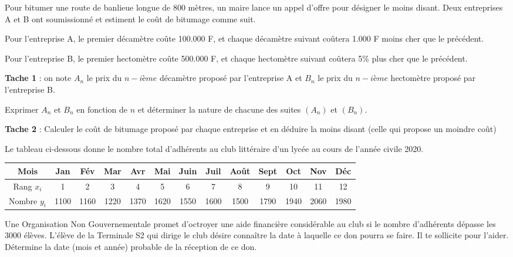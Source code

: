 \begin{exercice}
Pour bitumer une route de banlieue longue de 800 mètres, un maire lance un appel d’offre pour
désigner le moins disant. Deux entreprises A et B ont soumissionné et estiment le coût de bitumage
comme suit.
\medskip

\noindent Pour l’entreprise A, le premier décamètre coûte 100.000 F, et chaque décamètre suivant coûtera
1.000 F moins cher que le précédent.
\medskip

\noindent Pour l’entreprise B, le premier hectomètre coûte 500.000 F, et chaque hectomètre suivant coûtera
5\% plus cher que le précédent.

\medskip

\noindent \textbf{Tache 1 }: on note $A_n$ le prix du $n-ième$ décamètre proposé par l’entreprise A et $B_n$ le prix du $n-ième$ hectomètre proposé par l’entreprise B.

\noindent Exprimer $A_n$ et $B _n$ en fonction de $n$ et déterminer la nature de
chacune des suites $(A_n )$ et $(B_n )$.


\medskip
\noindent\textbf{Tache 2} : Calculer le coût de bitumage proposé par chaque entreprise et en déduire la moins disant
(celle qui propose un moindre coût)


\end{exercice}
\begin{exercice}



Le tableau ci-dessous donne le nombre total d’adhérents au club littéraire d’un lycée au cours de l’année civile 2020.

\begin{center}
\begin{tabular}{|c|c|c|c|c|c|c|c|c|c|c|c|c|}
\hline
Mois & Jan & Fév & Mar & Avr & Mai & Juin & Juil & Août & Sept & Oct & Nov & Déc \\
\hline
Rang $x_i$ & 1 & 2 & 3 & 4 & 5 & 6 & 7 & 8 & 9 & 10 & 11 & 12 \\\hline
Nombre $y_i$ & 1100 & 1160 & 1220 & 1370 & 1620 & 1550 & 1600 & 1500 & 1790 & 1940 & 2060 & 1980 \\
\hline
\end{tabular}
\end{center}

Une Organisation Non Gouvernementale promet d’octroyer une aide financière considérable au club si le nombre d’adhérents dépasse les 3000 élèves. L’élève de la Terminale S2 qui dirige le club désire connaître la date à laquelle ce don pourra se faire. Il te sollicite pour l’aider. Détermine la date (mois et année) probable de la réception de ce don.

\end{exercice}

